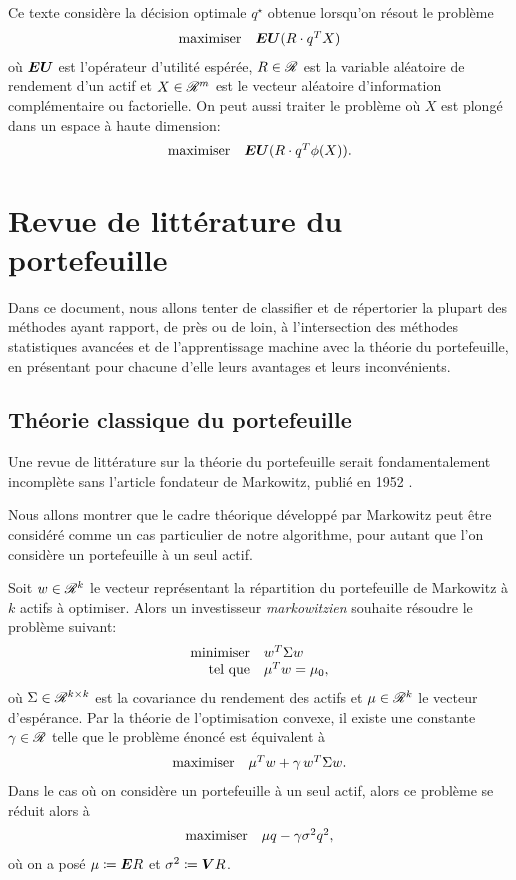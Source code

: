 
Ce texte considère la décision optimale $q^\star$ obtenue lorsqu'on résout le problème
\begin{equation}
  \label{probva}
  \begin{array}{ll}\mbox{maximiser} & {\bm{EU} (R\cdot q^TX)}\end{array}
\end{equation}
où $\bm{EU}$ est l'opérateur d'utilité espérée, $R\in\mathscr{R}$ est la variable aléatoire de
rendement d'un actif et $X\in\mathscr{R}^m$ est le vecteur aléatoire d'information complémentaire
ou factorielle. On peut aussi traiter le problème où $X$ est plongé dans un espace à haute
dimension:
\begin{equation}
  \begin{array}{ll}\mbox{maximiser} & {\bm{EU}(R\cdot q^T\phi(X)).}\end{array}
\end{equation}


\section{Revue de littérature du portefeuille}


Dans ce document, nous allons tenter de classifier et de répertorier la plupart des
méthodes ayant rapport, de près ou de loin, à l'intersection des méthodes statistiques
avancées et de l'apprentissage machine avec la théorie du portefeuille, en présentant pour
chacune d'elle leurs avantages et leurs inconvénients.

\subsection{Théorie classique du portefeuille}

Une revue de littérature sur la théorie du portefeuille serait fondamentalement incomplète
sans l'article fondateur de Markowitz, publié en 1952 \cite{markowitz1952portfolio}.

Nous allons montrer que le cadre théorique développé par Markowitz peut être considéré
comme un cas particulier de notre algorithme, pour autant que l'on considère un portefeuille
à un seul actif.

Soit $w\in\mathscr{R}^k$ le vecteur représentant la répartition du portefeuille de Markowitz à
$k$ actifs à optimiser. Alors un investisseur \textit{markowitzien} souhaite résoudre le
problème suivant:
\begin{equation}
  \minimizeEquationSt{w^T\Sigma w}[\mu^Tw = \mu_0,]
\end{equation}
où $\Sigma\in\mathscr{R}^{k\times k}$ est la covariance du rendement des actifs et
$\mu\in\mathscr{R}^k$ le vecteur d'espérance.   Par la théorie de
l'optimisation convexe, il existe une constante $\gamma\in\mathscr{R}$ telle que le problème énoncé est
équivalent à
\begin{equation}
  \begin{array}{ll}\mbox{maximiser} & {\mu^Tw + \gamma\,w^T\Sigma w.}\end{array}
\end{equation}
Dans le cas où on considère un portefeuille à un seul actif, alors ce problème se réduit
alors à
\begin{equation}
  \label{markov}
  \begin{array}{ll}\mbox{maximiser} & {\mu q - \gamma\sigma^2 q^2,}\end{array}
\end{equation}
où on a posé $\mu \coloneqq \bm E R$ et $\sigma^2 \coloneqq \bm V R$.


